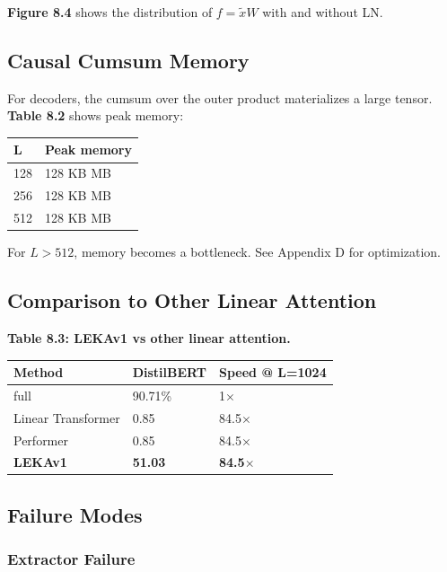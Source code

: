 \textbf{Figure 8.4} shows the distribution of $f = \tilde{x} W$ with and 
without LN.

\subsection{Causal Cumsum Memory}

For decoders, the cumsum over the outer product materializes a large 
tensor. \textbf{Table 8.2} shows peak memory:

\begin{table}[H]
\centering
\small
\begin{tabular}{ll}
\toprule
\textbf{L} & \textbf{Peak memory} \\
\midrule
128 & 128 KB MB \\
256 & 128 KB MB \\
512 & 128 KB MB \\
\bottomrule
\end{tabular}
\end{table}

For $L > 512$, memory becomes a bottleneck. See Appendix D for 
optimization.

\subsection{Comparison to Other Linear Attention}

\textbf{Table 8.3: LEKAv1 vs other linear attention.}

\begin{table}[H]
\centering
\small
\begin{tabular}{lll}
\toprule
\textbf{Method} & \textbf{DistilBERT} & \textbf{Speed @ L=1024} \\
\midrule
full & 90.71\% & 1$\times$ \\
Linear Transformer & 0.85 & 84.5$\times$ \\
Performer & 0.85 & 84.5$\times$ \\
\textbf{LEKAv1} & \textbf{51.03} & \textbf{84.5$\times$} \\
\bottomrule
\end{tabular}
\end{table}

\subsection{Failure Modes}

\subsubsection{Extractor Failure}

